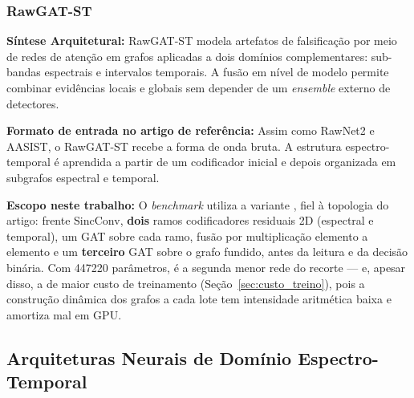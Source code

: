 \documentclass[12pt,a4paper]{article}
\begin{document}
\subsubsection[RawGAT-ST]{RawGAT-ST~\cite{tak2021rawgatst}}
\textbf{Síntese Arquitetural:} RawGAT-ST modela artefatos de falsificação por
meio de redes de atenção em grafos aplicadas a dois domínios complementares:
sub-bandas espectrais e intervalos temporais. A fusão em nível de modelo permite
combinar evidências locais e globais sem depender de um \textit{ensemble} externo
de detectores.

\par\textbf{Formato de entrada no artigo de referência:} Assim como RawNet2 e
AASIST, o RawGAT-ST recebe a forma de onda bruta. A estrutura espectro-temporal
é aprendida a partir de um codificador inicial e depois organizada em subgrafos
espectral e temporal.

\par\textbf{Escopo neste trabalho:} O \textit{benchmark} utiliza a variante
, fiel à
topologia do artigo: frente SincConv, \textbf{dois} ramos codificadores
residuais 2D (espectral e temporal), um GAT sobre cada ramo, fusão por
multiplicação elemento a elemento e um \textbf{terceiro} GAT sobre o grafo
fundido, antes da leitura e da decisão binária. Com \num{447220} parâmetros, é
a segunda menor rede do recorte --- e, apesar disso, a de maior custo de
treinamento (Seção~\ref{sec:custo_treino}), pois a construção dinâmica dos
grafos a cada lote tem intensidade aritmética baixa e amortiza mal em GPU.

\subsection{Arquiteturas Neurais de Domínio Espectro-Temporal}
\label{subsec:espectrais}
\end{document}
